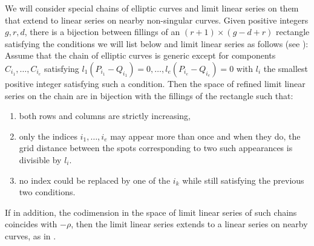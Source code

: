 \documentclass[11pt]{amsart}
\theoremstyle{definition}
\theoremstyle{definition}
\begin{document}
We will consider special chains of elliptic curves and limit linear series on them that extend to linear series on nearby non-singular curves.
Given positive integers $g, r, d$, there is a bijection between  fillings of an $(r+1)\times (g-d+r)$ rectangle satisfying the conditions we will list below and limit linear series as follows (see  \cite[Proposition~1.4]{DBN}):
Assume that the chain of elliptic curves is generic except for components   $C_{i_1},\dots,C_{i_e}$  satisfying  $l_1(P_{i_1}-Q_{i_1})=0,\dots, l_e(P_{i_e}-Q_{i_e})=0 $ 
with $l_i$ the smallest positive integer satisfying such a condition.
Then the space of refined limit linear series on the chain are in bijection with the fillings of the rectangle such that:
\begin{enumerate}
	\item[(A1)] both rows and columns are strictly increasing,
	\item[(A2)] only the indices 
	$i_1,\dots, i_e$  may appear more than once  and when they do, the grid distance between the spots corresponding to two such appearances is divisible by $l_i$.
	\item[(A3)] no index could be replaced by one of the $i_k$ while still satisfying the previous two conditions.
\end{enumerate}  
If in addition, the codimension in the space of limit linear series of such chains coincides with $-\rho$,
 then the limit linear series extends to a linear series on nearby curves, as in \cite[Theorem~2.1]{DBN}.
\end{document}
